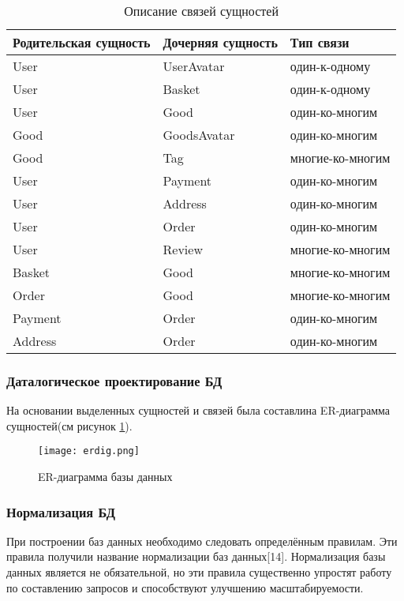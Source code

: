 \begin{longtable}{ | l | l | l | }
    \caption{Описание связей сущностей}
    \label{opisanie:suw}
    \endfirsthead
    \endhead
    \hline
    Родительская сущность & Дочерняя сущность & Тип связи  \\ \hline
    User & UserAvatar & один-к-одному \\ \hline
    User & Basket & один-к-одному \\ \hline
    User & Good & один-ко-многим \\ \hline
    Good & GoodsAvatar & один-ко-многим \\ \hline
    Good & Tag & многие-ко-многим \\ \hline
    User & Payment & один-ко-многим \\ \hline
    User & Address & один-ко-многим \\ \hline
    User & Order & один-ко-многим \\ \hline
    User & Review & многие-ко-многим \\ \hline
    Basket & Good & многие-ко-многим \\ \hline
    Order & Good & многие-ко-многим  \\ \hline
    Payment & Order & один-ко-многим \\ \hline
    Address & Order & один-ко-многим \\
    \hline
\end{longtable}

\subsubsection{Даталогическое проектирование БД}\hfill

На основании выделенных сущностей и связей была составлина ER-диаграмма сущностей(см рисунок \ref{erdiag}).

\begin{figure}[!htb]
    \centering
    \texttt{[image: erdig.png]}
    \caption{ER-диаграмма базы данных}
    \label{erdiag}
\end{figure}

\subsubsection{Нормализация БД}\hfill

При построении баз данных необходимо следовать определённым правилам.
Эти правила получили название нормализации баз данных[14].
Нормализация базы данных является не обязательной, но эти правила существенно упростят работу по составлению запросов и способствуют улучшению масштабируемости.

